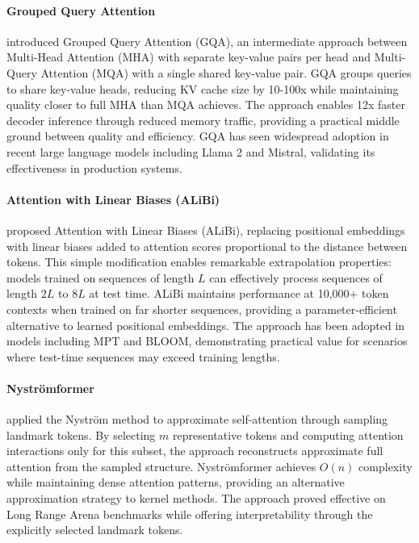 \paragraph{Grouped Query Attention}

\citet{ainslie2023gqa} introduced Grouped Query Attention (GQA), an intermediate approach between Multi-Head Attention (MHA) with separate key-value pairs per head and Multi-Query Attention (MQA) with a single shared key-value pair. GQA groups queries to share key-value heads, reducing KV cache size by 10-100x while maintaining quality closer to full MHA than MQA achieves. The approach enables 12x faster decoder inference through reduced memory traffic, providing a practical middle ground between quality and efficiency. GQA has seen widespread adoption in recent large language models including Llama 2 and Mistral, validating its effectiveness in production systems.

\paragraph{Attention with Linear Biases (ALiBi)}

\citet{press2022train} proposed Attention with Linear Biases (ALiBi), replacing positional embeddings with linear biases added to attention scores proportional to the distance between tokens. This simple modification enables remarkable extrapolation properties: models trained on sequences of length $L$ can effectively process sequences of length $2L$ to $8L$ at test time. ALiBi maintains performance at 10,000+ token contexts when trained on far shorter sequences, providing a parameter-efficient alternative to learned positional embeddings. The approach has been adopted in models including MPT and BLOOM, demonstrating practical value for scenarios where test-time sequences may exceed training lengths.

\paragraph{Nyströmformer}

\citet{xiong2021nystromformer} applied the Nyström method to approximate self-attention through sampling landmark tokens. By selecting $m$ representative tokens and computing attention interactions only for this subset, the approach reconstructs approximate full attention from the sampled structure. Nyströmformer achieves $O(n)$ complexity while maintaining dense attention patterns, providing an alternative approximation strategy to kernel methods. The approach proved effective on Long Range Arena benchmarks while offering interpretability through the explicitly selected landmark tokens.

